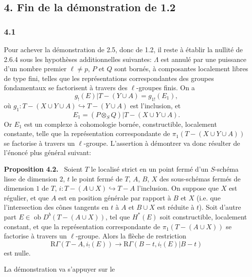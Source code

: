 \documentclass[11pt]{article}
\newenvironment{statement}[1]{\par\medskip\noindent\textbf{#1.}\ }{\par\medskip}
\providecommand{\Ob}{\operatorname{ob}}
\providecommand{\Ob}{\operatorname{ob}}
\providecommand{\Ob}{\operatorname{Ob}}
\providecommand{\Ob}{\operatorname{ob}}
\providecommand{\Ob}{\operatorname{Ob}}
\begin{document}
\subsection*{4. Fin de la démonstration de 1.2}

\subsubsection*{4.1}
Pour achever la démonstration de 2.5, donc de 1.2, il reste à établir la nullité de 2.6.4 sous les hypothèses additionnelles suivantes: $\Lambda$ est annulé par une puissance d'un nombre premier $\ell\ne p$, $P$ et $Q$ sont bornés, à composantes localement libres de type fini, telles que les représentations correspondantes des groupes fondamentaux se factorisent à travers des $\ell$-groupes finis. On a
\[
g_!(E)|T-(Y\cup A)=g_{1!}(E_1),
\]
où $g_1:T-(X\cup Y\cup A)\hookrightarrow T-(Y\cup A)$ est l'inclusion, et
\[
E_1=(P\otimes_S Q)|T-(X\cup Y\cup A).
\]
Or $E_1$ est un complexe à cohomologie bornée, constructible, localement constante, telle que la représentation correspondante de $\pi_1(T-(X\cup Y\cup A))$ se factorise à travers un $\ell$-groupe. L'assertion à démontrer va donc résulter de l'énoncé plus général suivant:

\begin{statement}{Proposition 4.2}
Soient $T$ le localisé strict en un point fermé d'un $S$-schéma lisse de dimension $2$, $t$ le point fermé de $T$, $A$, $B$, $X$ des sous-schémas fermés de dimension $1$ de $T$, $i:T-(A\cup X)\hookrightarrow T-A$ l'inclusion. On suppose que $X$ est régulier, et que $A$ est en position générale par rapport à $B$ et $X$ (i.e. que l'intersection des cônes tangents en $t$ à $A$ et $B\cup X$ est réduite à $t$). Soit d'autre part $E\in\Ob D^b(T-(A\cup X))$, tel que $H^*(E)$ soit constructible, localement constant, et que la représentation correspondante de $\pi_1(T-(A\cup X))$ se factorise à travers un $\ell$-groupe. Alors la flèche de restriction
\[
\mathrm R\Gamma(T-A,i_!(E))
\longrightarrow
\mathrm R\Gamma(B-t,i_!(E)|B-t)
\]
est nulle.
\end{statement}

La démonstration va s'appuyer sur le
\end{document}
